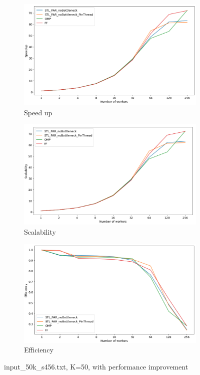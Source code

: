 \documentclass[12pt,a4paper]{report}
\begin{document}
\begin{figure}
     \centering
     \begin{subfigure}[b]{0.45\textwidth}
         \centering
         \includegraphics[width=\textwidth]{images/optimized-50k/speedup.png}
         \caption{Speed up}
         \label{fig:y equals x}
     \end{subfigure}
     \hfill
     \begin{subfigure}[b]{0.45\textwidth}
         \centering
         \includegraphics[width=\textwidth]{images/optimized-50k/scalability.png}
         \caption{Scalability}
         \label{fig:three sin x}
     \end{subfigure}
     \hfill
     \begin{subfigure}[b]{0.45\textwidth}
         \centering
         \includegraphics[width=\textwidth]{images/optimized-50k/efficiency.png}
         \caption{Efficiency}
         \label{fig:improved performance}
     \end{subfigure}
        \caption{{input\_50k\_s456.txt, K=50, with performance improvement}}
        \label{fig:three graphs}
\end{figure}
\end{document}
